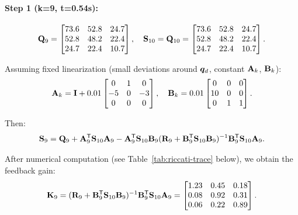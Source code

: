 \paragraph{Step 1 (k=9, t=0.54s):}
\begin{equation}
\mathbf{Q}_9 = \begin{bmatrix}
73.6 & 52.8 & 24.7 \\
52.8 & 48.2 & 22.4 \\
24.7 & 22.4 & 10.7
\end{bmatrix}, \quad \mathbf{S}_{10} = \mathbf{Q}_{10} = \begin{bmatrix}
73.6 & 52.8 & 24.7 \\
52.8 & 48.2 & 22.4 \\
24.7 & 22.4 & 10.7
\end{bmatrix}.
\end{equation}

Assuming fixed linearization (small deviations around $\bm{q}_d$, constant $\mathbf{A}_k$, $\mathbf{B}_k$):
\begin{equation}
\mathbf{A}_k = \mathbf{I} + 0.01 \begin{bmatrix}
0 & 1 & 0 \\
-5 & 0 & -3 \\
0 & 0 & 0
\end{bmatrix}, \quad
\mathbf{B}_k = 0.01 \begin{bmatrix}
0 & 0 & 0 \\
10 & 0 & 0 \\
0 & 1 & 1
\end{bmatrix}.
\end{equation}

Then:
\begin{equation}
\mathbf{S}_9 = \mathbf{Q}_9 + \mathbf{A}_9^{\mathsf{T}}\mathbf{S}_{10}\mathbf{A}_9
- \mathbf{A}_9^{\mathsf{T}}\mathbf{S}_{10}\mathbf{B}_9(\mathbf{R}_9 + \mathbf{B}_9^{\mathsf{T}}\mathbf{S}_{10}\mathbf{B}_9)^{-1}
\mathbf{B}_9^{\mathsf{T}}\mathbf{S}_{10}\mathbf{A}_9.
\end{equation}

After numerical computation (see Table~\ref{tab:riccati-trace} below), we obtain the
feedback gain:
\begin{equation}
\mathbf{K}_9 = (\mathbf{R}_9 + \mathbf{B}_9^{\mathsf{T}}\mathbf{S}_{10}\mathbf{B}_9)^{-1}\mathbf{B}_9^{\mathsf{T}}\mathbf{S}_{10}\mathbf{A}_9
= \begin{bmatrix}
1.23 & 0.45 & 0.18 \\
0.08 & 0.92 & 0.31 \\
0.06 & 0.22 & 0.89
\end{bmatrix}.
\label{eq:ch8:K9}
\end{equation}

